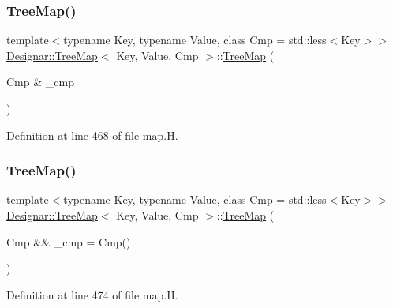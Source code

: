 \subsubsection{\texorpdfstring{Tree\+Map()}{TreeMap()}\hspace{0.1cm}{\footnotesize\ttfamily [2/7]}}
{\footnotesize\ttfamily template$<$typename Key, typename Value, class Cmp = std\+::less$<$\+Key$>$$>$ \\
\hyperlink{class_designar_1_1_tree_map}{Designar\+::\+Tree\+Map}$<$ Key, Value, Cmp $>$\+::\hyperlink{class_designar_1_1_tree_map}{Tree\+Map} (\begin{DoxyParamCaption}\item[{Cmp \&}]{\+\_\+cmp }\end{DoxyParamCaption})\hspace{0.3cm}{\ttfamily [inline]}}



Definition at line 468 of file map.\+H.

\mbox{\label{class_designar_1_1_tree_map_a10fa15275739543d0a7bc6470c0639dc}} 
\subsubsection{\texorpdfstring{Tree\+Map()}{TreeMap()}\hspace{0.1cm}{\footnotesize\ttfamily [3/7]}}
{\footnotesize\ttfamily template$<$typename Key, typename Value, class Cmp = std\+::less$<$\+Key$>$$>$ \\
\hyperlink{class_designar_1_1_tree_map}{Designar\+::\+Tree\+Map}$<$ Key, Value, Cmp $>$\+::\hyperlink{class_designar_1_1_tree_map}{Tree\+Map} (\begin{DoxyParamCaption}\item[{Cmp \&\&}]{\+\_\+cmp = {\ttfamily Cmp()} }\end{DoxyParamCaption})\hspace{0.3cm}{\ttfamily [inline]}}



Definition at line 474 of file map.\+H.

\mbox{\label{class_designar_1_1_tree_map_a59cf2c9babbf20a9db85f133aa15dfd5}} 

